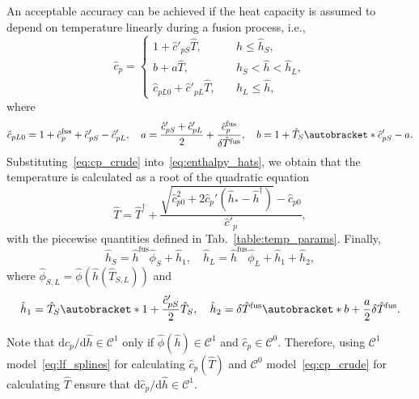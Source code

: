 \documentclass{article}
\newcommand{\dd}{\mathrm{d}}
\newcommand{\Der}[2][]{\dd#1/\dd#2}
\DeclarePairedDelimiter\autobracket()       %
\newcommand{\br}[1]{\autobracket*{#1}}
\newcommand{\fusion}[1]{{#1}^\mathrm{fus}}
\begin{document}
An acceptable accuracy can be achieved if the heat capacity is assumed
to depend on temperature linearly during a fusion process, i.e.,
\begin{equation}\label{eq:cp_crude}
	\hat{c}_p = \begin{cases}
        1 + \hat{c}'_{pS}\hat{T},             & \quad \hat{h} \leq \hat{h}_S, \\
        b + a\hat{T},                         & \quad \hat{h}_S < \hat{h} < \hat{h}_L, \\
        \hat{c}_{pL0} + \hat{c}'_{pL}\hat{T}, & \quad \hat{h}_L \leq \hat{h},
    \end{cases}
\end{equation}
where
\begin{equation*}
	\hat{c}_{pL0} = 1 + \fusion{\hat{c}_p} + \hat{c}'_{pS} - \hat{c}'_{pL}, \quad
	a = \frac{\hat{c}'_{pS} + \hat{c}'_{pL}}2 + \frac{\fusion{\hat{c}_p}}{\delta\fusion{\hat{T}}}, \quad
	b = 1 + \hat{T}_S\br{ \hat{c}'_{pS} - a }.
\end{equation*}
Substituting~\eqref{eq:cp_crude} into~\eqref{eq:enthalpy_hats},
we obtain that the temperature is calculated as a root of the quadratic equation
\begin{equation}\label{eq:temp_crude}
	\hat{T} = \hat{T}^\dag + \frac{\sqrt{\hat{c}_{p0}^2 + 2\hat{c}_p'(\hat{h}_* - \hat{h}^\dag) } - \hat{c}_{p0}}{\hat{c}'_p},
\end{equation}
with the piecewise quantities defined in Tab.~\ref{table:temp_params}. Finally,
\begin{equation}\label{eq:enthalpySL_crude}
	\hat{h}_S = \fusion{\hat{h}}\hat{\phi}_S + \hat{h}_1, \quad \hat{h}_L = \fusion{\hat{h}}\hat{\phi}_L + \hat{h}_1 + \hat{h}_2,
\end{equation}
where \(\hat{\phi}_{S,L} = \hat{\phi}(\hat{h}(\hat{T}_{S,L}))\) and
\begin{equation*}
	\hat{h}_1 = \hat{T}_S\br{ 1 + \frac{\hat{c}'_{pS}}2\hat{T}_S }, \quad
	\hat{h}_2 = \delta\fusion{\hat{T}}\br{ b + \frac{a}2\delta\fusion{\hat{T}} }.
\end{equation*}

Note that \(\Der[\hat{c}_p]{\hat{h}}\in\mathcal{C}^1\)
only if \(\hat{\phi}(\hat{h})\in\mathcal{C}^1\) and \(\hat{c}_p\in\mathcal{C}^0\).
Therefore, using \(\mathcal{C}^1\) model~\eqref{eq:lf_splines} for calculating \(\hat{c}_p(\hat{T})\)
and \(\mathcal{C}^0\) model~\eqref{eq:cp_crude} for calculating \(\hat{T}\)
ensure that \(\Der[\hat{c}_p]{\hat{h}}\in\mathcal{C}^1\).
\end{document}
